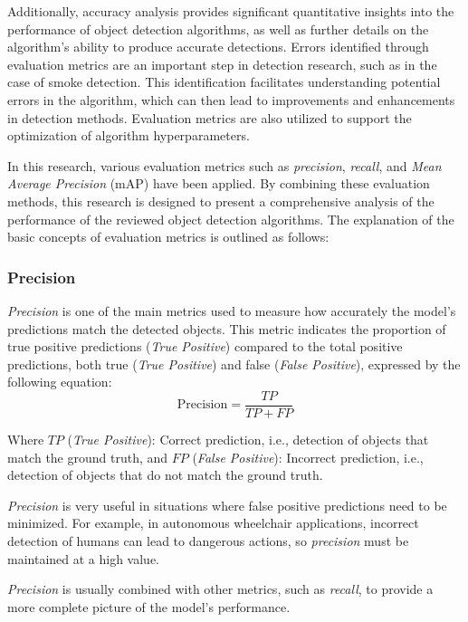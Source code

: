Additionally, accuracy analysis provides significant quantitative insights into the performance of object detection algorithms, as well as further details on the algorithm's ability to produce accurate detections. Errors identified through evaluation metrics are an important step in detection research, such as in the case of smoke detection. This identification facilitates understanding potential errors in the algorithm, which can then lead to improvements and enhancements in detection methods. Evaluation metrics are also utilized to support the optimization of algorithm hyperparameters.

In this research, various evaluation metrics such as \emph{precision}, \emph{recall}, and \emph{Mean Average Precision} (mAP) have been applied. By combining these evaluation methods, this research is designed to present a comprehensive analysis of the performance of the reviewed object detection algorithms. The explanation of the basic concepts of evaluation metrics is outlined as follows:

\vspace{5pt}
\subsubsection{Precision}
\label{subsubsec:precision}

\emph{Precision} is one of the main metrics used to measure how accurately the model's predictions match the detected objects. This metric indicates the proportion of true positive predictions (\emph{True Positive}) compared to the total positive predictions, both true (\emph{True Positive}) and false (\emph{False Positive}), expressed by the following equation:
\begin{equation}
  \mathrm{Precision} = \frac{TP}{TP + FP}
\end{equation}

Where \(TP\) (\emph{True Positive}): Correct prediction, i.e., detection of objects that match the ground truth, and \(FP\) (\emph{False Positive}): Incorrect prediction, i.e., detection of objects that do not match the ground truth.

\emph{Precision} is very useful in situations where false positive predictions need to be minimized. For example, in autonomous wheelchair applications, incorrect detection of humans can lead to dangerous actions, so \emph{precision} must be maintained at a high value.

\emph{Precision} is usually combined with other metrics, such as \emph{recall}, to provide a more complete picture of the model's performance.

